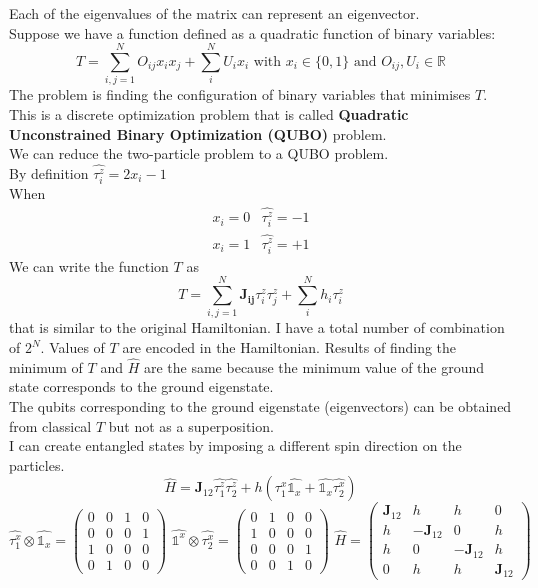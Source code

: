 Each of the eigenvalues of the matrix can represent an eigenvector.\\
\newline
Suppose we have a function defined as a quadratic function of binary variables:
\[
T=\sum_{i,j=1}^N O_{ij}x_ix_j+\sum_i^N U_ix_i \text{ with } x_i\in \{0,1\} \text{ and } O_{ij},U_i\in \mathbb{R}
\]
The problem is finding the configuration of binary variables that minimises $T$. This is a discrete optimization problem that is called \textbf{Quadratic Unconstrained Binary Optimization (QUBO)} problem.\\
We can reduce the two-particle problem to a QUBO problem.\\
By definition $\hat{\tau_i^z}=2x_i-1$\\
When \[\begin{matrix}x_i=0&\hat{\tau_i^z}=-1\\x_i=1&\hat{\tau_i^z}=+1 \end{matrix}\]
We can write the function $T$ as
\[
T=\sum_{i,j=1}^N \mathbf{J_{ij}}\tau_i^z\tau_j^z+\sum_i^N h_i\tau_i^z
\]
that is similar to the original Hamiltonian. I have a total number of combination of $2^N$. Values of $T$ are encoded in the Hamiltonian. Results of finding the minimum of $T$ and $\hat{H}$ are the same because the minimum value of the ground state corresponds to the ground eigenstate. \\
The qubits corresponding to the ground eigenstate (eigenvectors) can be obtained from classical $T$ but not as a superposition.\\
I can create entangled states by imposing a different spin direction on the particles.
\[
\hat{H}=\mathbf{J}_{12}\hat{\tau_1^z}\hat{\tau_2^z}+h(\hat{\tau_1^x}\hat{\mathbb{1}_x}+\hat{\mathbb{1}_x}\hat{\tau_2^x})
\]
\[\hat{\tau_1^x}\otimes\hat{\mathbb{1}_x}=\begin{pmatrix}0&0&1&0\\0&0&0&1\\1&0&0&0\\0&1&0&0\end{pmatrix}\,\,
\hat{\mathbb{1}^x}\otimes\hat{\tau_2^x}=\begin{pmatrix}0&1&0&0\\1&0&0&0\\0&0&0&1\\0&0&1&0\end{pmatrix}\,\,
\hat{H}=\begin{pmatrix}\mathbf{J}_{12}&h&h&0\\h&-\mathbf{J}_{12}&0&h\\h&0&-\mathbf{J}_{12}&h\\0&h&h&\mathbf{J}_{12}\end{pmatrix}\]
